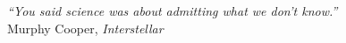 
\begin{dedication} 


\vspace*{\fill}


\textit{“You said science was about admitting what we don't know.”}\\
Murphy Cooper, \textit{Interstellar}
\end{dedication}